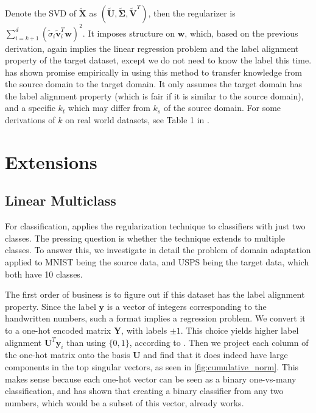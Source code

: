 \documentclass[twoside,11pt]{article}
\begin{document}
Denote the SVD of $\mathbf{\tilde{X}}$ as $(\mathbf{\tilde{U}}, \mathbf{\tilde{\Sigma}}, \mathbf{\tilde{V}}^T)$, then the regularizer is $\sum_{i=k+1}^d (\tilde{\sigma}_i \mathbf{\tilde{v}}_i^T \mathbf{w} )^2$. It imposes structure on $\mathbf{w}$, which, based on the previous derivation, again implies the linear regression problem and the label alignment property of the target dataset, except we do not need to know the label this time. \cite{imani2022label} has shown promise empirically in using this method to transfer knowledge from the source domain to the target domain. It only assumes the target domain has the label alignment property (which is fair if it is similar to the source domain), and a specific $k_t$ which may differ from $k_s$ of the source domain. For some derivations of $k$ on real world datasets, see Table 1 in \cite{imani2022label}. 

\section{Extensions}

\subsection{Linear Multiclass}

For classification, \cite{imani2022label} applies the regularization technique to classifiers with just two classes. The pressing question is whether the technique extends to multiple classes. To answer this, we investigate in detail the problem of domain adaptation applied to MNIST being the source data, and USPS being the target data, which both have 10 classes. 

The first order of business is to figure out if this dataset has the label alignment property. Since the label $\mathbf{y}$ is a vector of integers corresponding to the handwritten numbers, such a format implies a regression problem. We convert it to a one-hot encoded matrix $\mathbf{Y}$, with labels $\pm 1$. This choice yields higher label alignment $\mathbf{U}^T \mathbf{y}_i$ than using $\{0,1\}$, according to \cite{imani2022label}. Then we project each column of the one-hot matrix onto the basis $\mathbf{U}$ and find that it does indeed have large components in the top singular vectors, as seen in \ref{fig:cumulative_norm}. This makes sense because each one-hot vector can be seen as a binary one-vs-many classification, and \cite{imani2022label} has shown that creating a binary classifier from any two numbers, which would be a subset of this vector, already works. 
\end{document}
